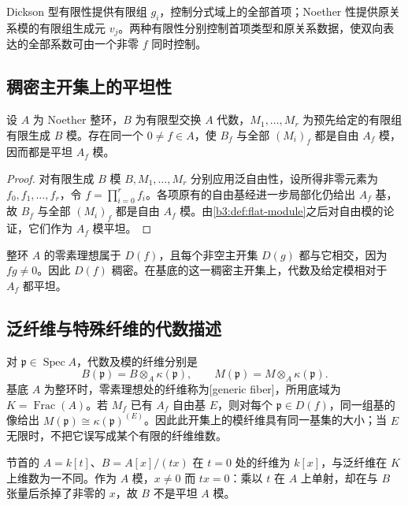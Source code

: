 Dickson 型有限性提供有限组 \(g_i\)，控制分式域上的全部首项；Noether 性提供原关系模的有限组生成元 \(v_j\)。两种有限性分别控制首项类型和原关系数据，使双向表达的全部系数可由一个非零 \(f\) 同时控制。

\subsection{稠密主开集上的平坦性}
\label{b3:subsec:1204:03}

\begin{corollary}[泛平坦性]\label{b3:cor:generic-flatness}
	设 \(A\) 为 Noether 整环，\(B\) 为有限型交换 \(A\) 代数，\(M_1,\ldots,M_r\) 为预先给定的有限组有限生成 \(B\) 模。存在同一个 \(0\ne f\in A\)，使 \(B_f\) 与全部 \((M_i)_f\) 都是自由 \(A_f\) 模，因而都是平坦 \(A_f\) 模。
\end{corollary}
\begin{proof}
	对有限生成 \(B\) 模 \(B,M_1,\ldots,M_r\) 分别应用泛自由性，设所得非零元素为 \(f_0,f_1,\ldots,f_r\)，令 \(f=\prod_{i=0}^r f_i\)。各项原有的自由基经进一步局部化仍给出 \(A_f\) 基，故 \(B_f\) 与全部 \((M_i)_f\) 都是自由 \(A_f\) 模。由\cref{b3:def:flat-module}之后对自由模的论证，它们作为 \(A_f\) 模平坦。
\end{proof}

整环 \(A\) 的零素理想属于 \(D(f)\)，且每个非空主开集 \(D(g)\) 都与它相交，因为 \(fg\ne0\)。因此 \(D(f)\) 稠密。在基底的这一稠密主开集上，代数及给定模相对于 \(A_f\) 都平坦。

\subsection{泛纤维与特殊纤维的代数描述}
\label{b3:subsec:1204:04}

对 \(\mathfrak p\in\operatorname{Spec}A\)，代数及模的纤维分别是
\[
	B(\mathfrak p)=B\otimes_A\kappa(\mathfrak p),\qquad M(\mathfrak p)=M\otimes_A\kappa(\mathfrak p).
\]
基底 \(A\) 为整环时，零素理想处的纤维称为[generic fiber]，所用底域为 \(K=\operatorname{Frac}(A)\)。若 \(M_f\) 已有 \(A_f\) 自由基 \(E\)，则对每个 \(\mathfrak p\in D(f)\)，同一组基的像给出 \(M(\mathfrak p)\cong\kappa(\mathfrak p)^{(E)}\)。因此此开集上的模纤维具有同一基集的大小；当 \(E\) 无限时，不把它误写成某个有限的纤维维数。

\ProseParagraphBreak
节首的 \(A=k[t]\)、\(B=A[x]/(tx)\) 在 \(t=0\) 处的纤维为 \(k[x]\)，与泛纤维在 \(K\) 上维数为一不同。作为 \(A\) 模，\(x\ne0\) 而 \(tx=0\)：乘以 \(t\) 在 \(A\) 上单射，却在与 \(B\) 张量后杀掉了非零的 \(x\)，故 \(B\) 不是平坦 \(A\) 模。

